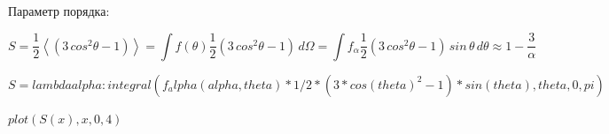 \documentclass[11pt]{article}
\begin{document}
    Параметр порядка:

\begin{equation}
S=\frac{1}{2}\left<\left(3\,cos^{2} \theta - 1 \right)\right> =
\int f\left(\theta\right)\frac{1}{2}\left(3\,cos^2\theta - 1\right)\,d\Omega =
\int f_{\alpha}\frac{1}{2}\left(3\,cos^2\theta - 1\right)\,sin\,\theta\,d\theta \approx 1-\frac{3}{\alpha}
\end{equation}

$S = lambda alpha : integral(f_alpha(alpha, theta)*1/2*(3*cos(theta)^2-1)*sin(theta), theta, 0, pi)$



$plot(S(x), x, 0, 4)$
 
            
    
\end{document}
